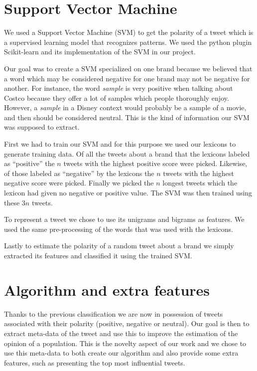 \documentclass[a4paper,12pt]{report}
\begin{document}
\section{Support Vector Machine}

We used a Support Vector Machine (SVM) to get the polarity of a tweet which is a supervised learning model that recognizes patterns. We used the python plugin Scikit-learn\cite{Scikit} and its implementation of the SVM in our project.

Our goal was to create a SVM specialized on one brand because we believed that a word which may be considered negative for one brand may not be negative for another.
For instance, the word \textit{sample} is very positive when talking about Costco because they offer a lot of samples which people thoroughly enjoy. However, a \textit{sample} in a Disney context would probably be a sample of a movie, and then should be considered neutral.
This is the kind of information our SVM was supposed to extract.

First we had to train our SVM and for this purpose we used our lexicons to generate training data. Of all the tweets about a brand that the lexicons labeled as ``positive'' the $n$ tweets with the highest positive score were picked. Likewise, of those labeled as ``negative'' by the lexicons the $n$ tweets with the highest negative score were picked. Finally we picked the $n$ longest tweets which the lexicon had given no negative or positive value. The SVM was then trained using these $3n$ tweets.

To represent a tweet we chose to use its unigrams and bigrams as features. We used the same pre-processing of the words that was used with the lexicons.

Lastly to estimate the polarity of a random tweet about a brand we simply extracted its features and classified it using the trained SVM.

\section{Algorithm and extra features}

Thanks to the previous classification we are now in possession of tweets associated with their polarity (positive, negative or neutral). Our goal is then to extract meta-data of the tweet and use this to improve the estimation of the opinion of a population.
This is the novelty aspect of our work and we chose to use this meta-data to both create our algorithm and also provide some extra features, such as presenting the top most influential tweets.
\end{document}
